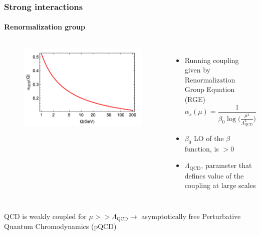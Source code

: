 \documentclass[aspectratio=43]{beamer}
\begin{document}
\begin{frame}

	\frametitle{Strong interactions}
	\framesubtitle{Renormalization group}

	\begin{columns}	
	
	
	\begin{figure}
		\includegraphics[width = 5 cm]{plots/qcd_coupling.png}
	\end{figure}
	
	
	\begin{itemize}
		\item \footnotesize Running coupling given by Renormalization Group Equation (RGE)
		\begin{equation}
			\alpha_{s}(\mu) = \frac{1}{\beta_{0} \log\big( \frac{\mu^{2}}{\Lambda_{\textrm{QCD}}^{2}}\big)} \nonumber
		\end{equation}
		\item \footnotesize $\beta_{0}$ LO of the $\beta$ function, is $ > 0$
		\item \footnotesize $\Lambda_{\textrm{QCD}}$, parameter that defines value of the coupling at large scales
	\end{itemize}
	
\end{columns}
	
	\vspace{1cm}
	\center QCD is weakly coupled for $\mu >> \Lambda_{\textrm{QCD}} \longrightarrow$ asymptotically free
	\center \color{red} Perturbative Quantum Chromodynamics (pQCD)

\end{frame}
\end{document}
